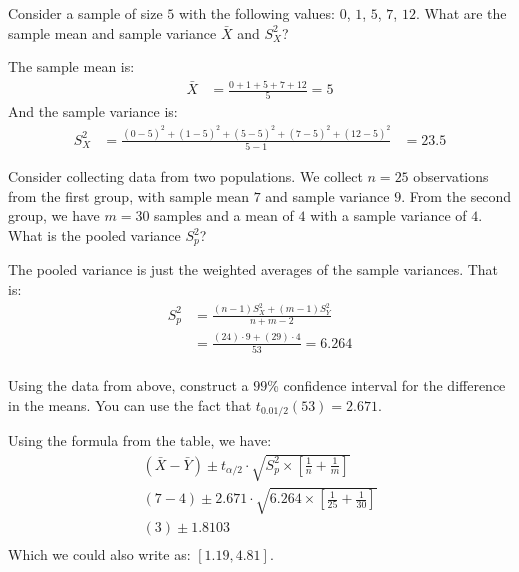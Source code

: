 
Consider a sample of size $5$ with the following values: $0$, $1$, $5$, $7$, $12$.
What are the sample mean and sample variance $\bar{X}$ and $S^2_X$?



The sample mean is:
\begin{align*}
\bar{X} &= \frac{0 + 1 + 5 + 7 + 12}{5} = 5
\end{align*}
And the sample variance is:
\begin{align*}
S^2_X &= \frac{(0-5)^2 + (1-5)^2 + (5-5)^2 + (7-5)^2 + (12-5)^2}{5 - 1} &= 23.5
\end{align*}


Consider collecting data from two populations. We collect $n=25$ observations
from the first group, with sample mean $7$ and sample variance $9$. From the 
second group, we have $m=30$ samples and a mean of $4$ with a sample variance
of $4$. What is the pooled variance $S^2_p$?


The pooled variance is just the weighted averages of the sample variances.
That is:
\begin{align*}
S_p^2 &= \frac{(n-1) S_X^2 + (m-1) S_Y^2}{n + m - 2} \\
&= \frac{(24) \cdot 9 + (29) \cdot 4}{53} = 6.264 \\
\end{align*}


Using the data from above, construct a $99$\% confidence interval for the 
difference in the means. You can use the fact that $t_{0.01/2}(53) = 2.671$. 



Using the formula from the table, we have:
\begin{align*}
(\bar{X} - \bar{Y}) \pm t_{\alpha/2} \cdot \sqrt{S_p^2 \times \left[\frac{1}{n} + \frac{1}{m}\right]} \\
(7-4) \pm 2.671 \cdot \sqrt{6.264 \times \left[\frac{1}{25} + \frac{1}{30}\right]} \\
(3) \pm 1.8103 \\
\end{align*}
Which we could also write as: $[1.19, 4.81]$.

